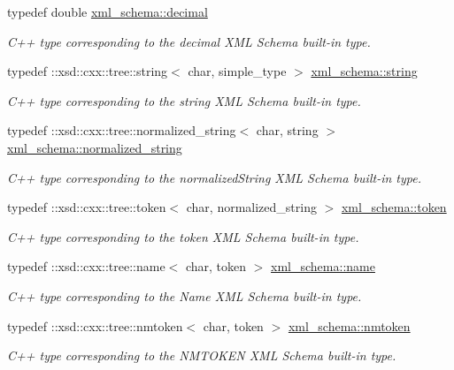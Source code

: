\begin{DoxyCompactItemize}
typedef double \hyperlink{namespacexml__schema_a69bfaf24f63a8c18ebd8e21db6b343df}{xml\+\_\+schema\+::decimal}
\begin{DoxyCompactList}\small\item\em C++ type corresponding to the decimal X\+M\+L Schema built-\/in type. \end{DoxyCompactList}\item 
typedef \+::xsd\+::cxx\+::tree\+::string$<$ char, simple\+\_\+type $>$ \hyperlink{namespacexml__schema_aefbaf353f9a0043af46d23d9040ef268}{xml\+\_\+schema\+::string}
\begin{DoxyCompactList}\small\item\em C++ type corresponding to the string X\+M\+L Schema built-\/in type. \end{DoxyCompactList}\item 
typedef \+::xsd\+::cxx\+::tree\+::normalized\+\_\+string$<$ char, string $>$ \hyperlink{namespacexml__schema_a429c44c2779bb6c82332127aa59c61fe}{xml\+\_\+schema\+::normalized\+\_\+string}
\begin{DoxyCompactList}\small\item\em C++ type corresponding to the normalized\+String X\+M\+L Schema built-\/in type. \end{DoxyCompactList}\item 
typedef \+::xsd\+::cxx\+::tree\+::token$<$ char, normalized\+\_\+string $>$ \hyperlink{namespacexml__schema_abdb824cb755f58704a95b28f017dd0f7}{xml\+\_\+schema\+::token}
\begin{DoxyCompactList}\small\item\em C++ type corresponding to the token X\+M\+L Schema built-\/in type. \end{DoxyCompactList}\item 
typedef \+::xsd\+::cxx\+::tree\+::name$<$ char, token $>$ \hyperlink{namespacexml__schema_abefc242069a8a8b837230355cbc238a1}{xml\+\_\+schema\+::name}
\begin{DoxyCompactList}\small\item\em C++ type corresponding to the Name X\+M\+L Schema built-\/in type. \end{DoxyCompactList}\item 
typedef \+::xsd\+::cxx\+::tree\+::nmtoken$<$ char, token $>$ \hyperlink{namespacexml__schema_a4de61deb214b4d95f53954ccadaee326}{xml\+\_\+schema\+::nmtoken}
\begin{DoxyCompactList}\small\item\em C++ type corresponding to the N\+M\+T\+O\+K\+E\+N X\+M\+L Schema built-\/in type. \end{DoxyCompactList}\item 

\end{DoxyCompactItemize}
